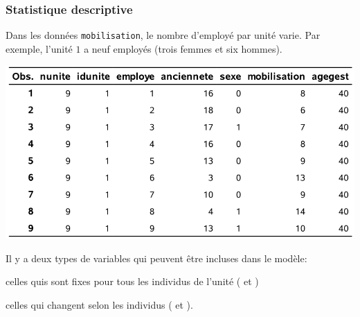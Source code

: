 \documentclass{beamer}
\begin{document}
\begin{frame}[fragile]
\frametitle{Statistique descriptive}
Dans les données \texttt{mobilisation}, le nombre d'employé par unité varie.
Par exemple, l'unité $1$ a neuf employés (trois femmes et six hommes).
\begin{center}
 \includegraphics[width = 0.7\linewidth]{img/c6/diapos7-e06}
\end{center}
{\small
Il y a deux types de variables qui peuvent être incluses dans le modèle:
\be

\item celles quis sont fixes pour tous les individus de l'unité ( et )
\item celles qui changent selon les individus ( et ).
\ee
}
\end{frame}
\end{document}
